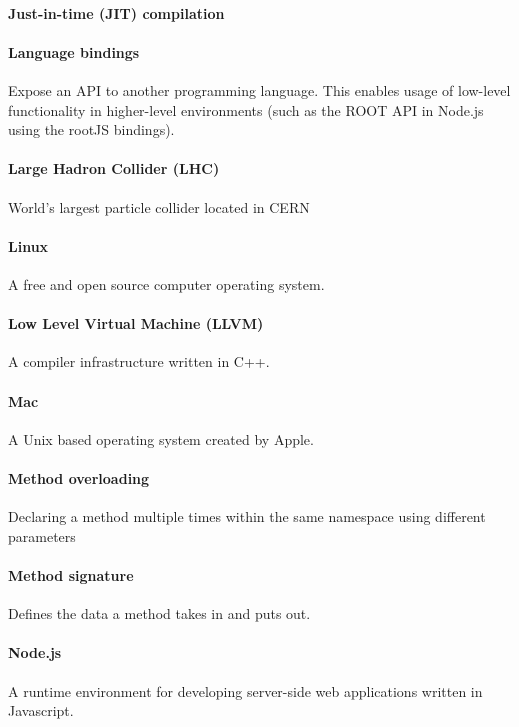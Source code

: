 \paragraph{Just-in-time (JIT) compilation}

\paragraph{Language bindings}
Expose an API to another programming language. This enables usage of low-level functionality in higher-level environments (such as the ROOT API in Node.js using the rootJS bindings).

\paragraph{Large Hadron Collider (LHC)}
World's largest particle collider located in CERN

\paragraph{Linux}
A free and open source computer operating system.

\paragraph{Low Level Virtual Machine (LLVM)}
A compiler infrastructure written in C++.

\paragraph{Mac}
A Unix based operating system created by Apple.

\paragraph{Method overloading}
Declaring a method multiple times within the same namespace using different parameters

\paragraph{Method signature}
Defines the data a method takes in and puts out. 

\paragraph{Node.js}
A runtime environment for developing server-side web applications written in Javascript.

